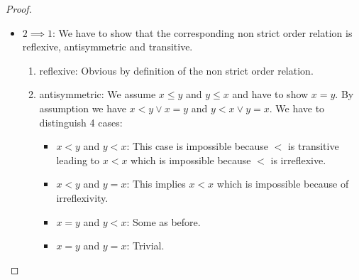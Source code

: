 \begin{definition}
\begin{proof}
\begin{itemize}
\begin{enumerate}
                    \item transitive: We assume $x < y$ and $y < z$ and have to
                        show $x < z$ which by definition is satisfied by $x \le
                        z$ and $x \ne z$.

                        Expanding the definition of $<$ we get $x \le y$, $x \ne
                        y$, $y \le z$, $y \ne z$. Transitivity of $\le$ leads to
                        $x \le z$.

                        It remains to show $x \ne z$. We assume $x = z$. This
                        leads to $y \le x$ using $y \le z$. By antisymmetry we
                        get $x = y$ which contradicts the assumption $x < y$.
                \end{enumerate}

            \item $2 \implies 1$: We have to show that the corresponding
                non strict order relation is reflexive, antisymmetric and
                transitive.

                \begin{enumerate}
                    \item reflexive: Obvious by definition of the non strict
                        order relation.

                    \item antisymmetric: We assume $x \le y$ and $y \le x$ and
                        have to show $x = y$. By assumption we have $x < y \lor
                        x = y$ and $y < x \lor y = x$. We have to distinguish 4
                        cases:
                        \begin{itemize}
                            \item $x < y$ and $y < x$: This case is impossible
                                because $<$ is transitive leading to $x < x$
                                which is impossible because $<$ is
                                irreflexive.

                            \item $x < y$ and $y = x$: This implies $x < x$
                                which is impossible because of irreflexivity.

                            \item $x = y$ and $y < x$: Some as before.

                            \item $x = y$ and $y = x$: Trivial.
                        \end{itemize}


\end{enumerate}
\end{itemize}
\end{proof}
\end{definition}
